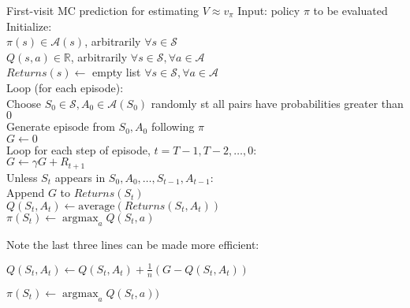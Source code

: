 \documentclass[twocolumn]{article}
\DeclareMathOperator*{\argmax}{argmax}
\begin{document}
\begin{mydef}{First-visit MC prediction for estimating $V \approx v_\pi$}{}
    Input: policy $\pi$ to be evaluated \\

    Initialize: \\
        \hspace*{2em}$\pi(s) \in \mathcal A(s)$, arbitrarily $\forall s \in \mathcal S$ \\
        \hspace*{2em}$Q(s, a) \in \mathbb R$, arbitrarily $\forall s \in \mathcal S, \forall a \in \mathcal A$ \\
        \hspace*{2em}$Returns(s) \leftarrow$ empty list $\forall s \in \mathcal S, \forall a \in \mathcal A$ \\

    Loop (for each episode): \\
        \hspace*{2em}Choose $S_0 \in \mathcal S, A_0 \in \mathcal A(S_0)$ randomly st all pairs have probabilities greater than $0$ \\
        \hspace*{2em}Generate episode from $S_0, A_0$ following $\pi$ \\
        \hspace*{2em}$G \leftarrow 0$ \\
        \hspace*{2em}Loop for each step of episode, $t = T-1, T-2, \dots, 0$: \\
            \hspace*{4em}$G \leftarrow \gamma G + R_{t+1}$ \\
            \hspace*{4em}Unless $S_t$ appears in $S_0, A_0, \dots, S_{t-1}, A_{t-1}$: \\
                \hspace*{6em}Append $G$ to $Returns(S_t)$ \\
                \hspace*{6em}$Q(S_t, A_t) \leftarrow \text{average}(Returns(S_t, A_t))$ \\
                \hspace*{6em}$\pi(S_t) \leftarrow \argmax_a Q(S_t, a)$
\end{mydef}

Note the last three lines can be made more efficient:

$Q(S_t, A_t) \leftarrow Q(S_t, A_t) + \frac{1}{n} (G - Q(S_t, A_t))$

$\pi(S_t) \leftarrow \argmax_a Q(S_t, a))$

\vspace{-.5em}
\dotfill
\end{document}
